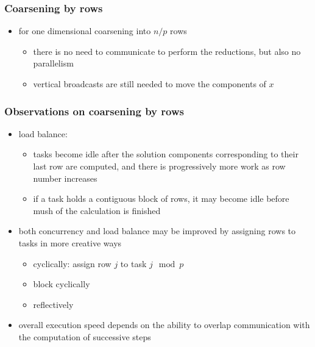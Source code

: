 \begin{frame}[fragile]
%
  \frametitle{Coarsening by rows}
%
  \begin{itemize}
%
  \item for one dimensional coarsening into $n/p$ rows
    \begin{itemize}
    \item there is no need to communicate to perform the reductions, but also no parallelism
    \item vertical broadcasts are still needed to move the components of $x$
    \end{itemize}
%
  \begin{center}
    \begin{minipage}{.85\linewidth}
      \begin{algorithm}[H]
%
        \DontPrintSemicolon
        \NoCaptionOfAlgo
        \SetAlCapHSkip{0ex}
%
% 
      \end{algorithm}
    \end{minipage}
  \end{center}
%
  \end{itemize}
%
\end{frame}

\begin{frame}[fragile]
%
  \frametitle{Observations on coarsening by rows}
%
  \begin{itemize}
%
  \item load balance:
%
    \begin{itemize}
    \item tasks become idle after the solution components corresponding to their last row are
      computed, and there is progressively more work as row number increases
    \item if a task holds a contiguous block of rows, it may become idle before mush of the
      calculation is finished
    \end{itemize}
%
  \item both concurrency and load balance may be improved by assigning rows to tasks in more
    creative ways
    \begin{itemize}
    \item cyclically: assign row $j$ to task $j \mod p$
    \item block cyclically
    \item reflectively
    \end{itemize}
%
  \item overall execution speed depends on the ability to overlap communication with the
    computation of successive steps
%
  \end{itemize}
%
\end{frame}

